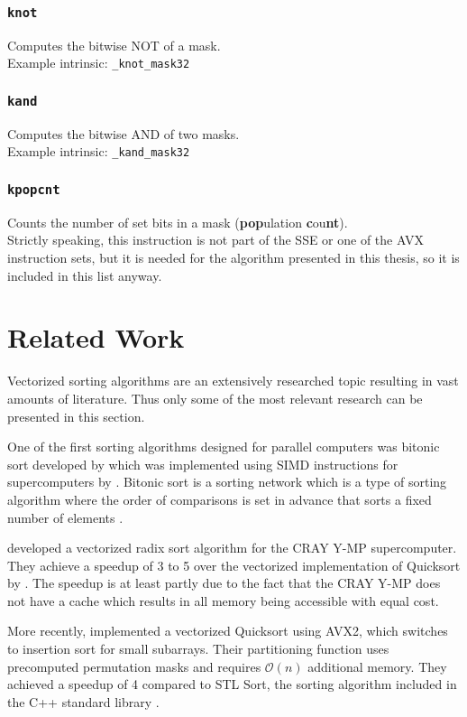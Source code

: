 \documentclass[12pt, a4paper, openright, twoside]{tiarbeit}
\begin{document}
\subsection*{\texttt{knot}}
Computes the bitwise NOT of a mask.\\
Example intrinsic: \texttt{\_knot\_mask32}

\subsection*{\texttt{kand}}
Computes the bitwise AND of two masks.\\
Example intrinsic: \texttt{\_kand\_mask32}

\subsection*{\texttt{kpopcnt}}
Counts the number of set bits in a mask (\textbf{pop}ulation \textbf{c}ou\textbf{nt}).\\
Strictly speaking, this instruction is not part of the SSE or one of the AVX
instruction sets, but it is needed for the algorithm presented in this thesis,
so it is included in this list anyway.


\chapter{Related Work}

Vectorized sorting algorithms are an extensively researched topic resulting
in vast amounts of literature. Thus only some of the most relevant
research can be presented in this section.

One of the first sorting algorithms designed for parallel computers was
bitonic sort developed by \citet{first_bitonic_sort} which was implemented
using SIMD instructions for supercomputers by \citet{simd_bitonic_sort}.
Bitonic sort is a sorting network which is a type of sorting algorithm
where the order of comparisons is set in advance that sorts a fixed number of
elements \citep{enwiki:sorting_network}.

\citet{radix_cray_y-mp} developed a vectorized radix sort algorithm for the
CRAY Y-MP supercomputer. They achieve a speedup of 3 to 5 over the vectorized
implementation of Quicksort by \citet{levin_vectorized_quicksort}.
The speedup is at least partly due to the fact that the CRAY Y-MP
does not have
a cache which results in all memory being accessible with equal cost.

More recently, \citet{fast_quicksort_gueron_krasnov} implemented a vectorized
Quicksort using AVX2, which switches to insertion sort for small subarrays.
Their partitioning function uses precomputed permutation
masks and requires $\mathcal{O}(n)$
additional memory. They achieved a speedup of 4 compared to STL Sort,
the sorting algorithm included in the C++ standard library
\citep{enwiki:stl_sort}.
\end{document}
